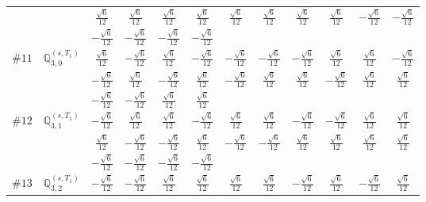 \documentclass[fleqn,9pt,landscape]{jsarticle}
\begin{document}
\begin{center}
\begin{longtable}{lcccccccccc}
& $ \frac{\sqrt{6}}{12} $ & $ \frac{\sqrt{6}}{12} $ & $ \frac{\sqrt{6}}{12} $ & $ \frac{\sqrt{6}}{12} $ & $ \frac{\sqrt{6}}{12} $ & $ \frac{\sqrt{6}}{12} $ & $ \frac{\sqrt{6}}{12} $ & $ \frac{\sqrt{6}}{12} $ & $ - \frac{\sqrt{6}}{12} $ & $ - \frac{\sqrt{6}}{12} $ \\
& $ - \frac{\sqrt{6}}{12} $ & $ - \frac{\sqrt{6}}{12} $ & $ - \frac{\sqrt{6}}{12} $ & $ - \frac{\sqrt{6}}{12} $ & $  $ & $  $ & $  $ & $  $ & $  $ & $  $ \\ \hline
$ \#11\quad \mathbb{Q}_{3,0}^{(s,T_{1})} $ & $ \frac{\sqrt{6}}{12} $ & $ - \frac{\sqrt{6}}{12} $ & $ \frac{\sqrt{6}}{12} $ & $ - \frac{\sqrt{6}}{12} $ & $ - \frac{\sqrt{6}}{12} $ & $ - \frac{\sqrt{6}}{12} $ & $ - \frac{\sqrt{6}}{12} $ & $ \frac{\sqrt{6}}{12} $ & $ \frac{\sqrt{6}}{12} $ & $ - \frac{\sqrt{6}}{12} $ \\
& $ - \frac{\sqrt{6}}{12} $ & $ \frac{\sqrt{6}}{12} $ & $ - \frac{\sqrt{6}}{12} $ & $ \frac{\sqrt{6}}{12} $ & $ - \frac{\sqrt{6}}{12} $ & $ \frac{\sqrt{6}}{12} $ & $ \frac{\sqrt{6}}{12} $ & $ - \frac{\sqrt{6}}{12} $ & $ \frac{\sqrt{6}}{12} $ & $ \frac{\sqrt{6}}{12} $ \\
& $ - \frac{\sqrt{6}}{12} $ & $ - \frac{\sqrt{6}}{12} $ & $ \frac{\sqrt{6}}{12} $ & $ \frac{\sqrt{6}}{12} $ & $  $ & $  $ & $  $ & $  $ & $  $ & $  $ \\ \hline
$ \#12\quad \mathbb{Q}_{3,1}^{(s,T_{1})} $ & $ - \frac{\sqrt{6}}{12} $ & $ \frac{\sqrt{6}}{12} $ & $ \frac{\sqrt{6}}{12} $ & $ - \frac{\sqrt{6}}{12} $ & $ \frac{\sqrt{6}}{12} $ & $ \frac{\sqrt{6}}{12} $ & $ - \frac{\sqrt{6}}{12} $ & $ - \frac{\sqrt{6}}{12} $ & $ \frac{\sqrt{6}}{12} $ & $ \frac{\sqrt{6}}{12} $ \\
& $ \frac{\sqrt{6}}{12} $ & $ - \frac{\sqrt{6}}{12} $ & $ - \frac{\sqrt{6}}{12} $ & $ \frac{\sqrt{6}}{12} $ & $ - \frac{\sqrt{6}}{12} $ & $ - \frac{\sqrt{6}}{12} $ & $ \frac{\sqrt{6}}{12} $ & $ \frac{\sqrt{6}}{12} $ & $ \frac{\sqrt{6}}{12} $ & $ \frac{\sqrt{6}}{12} $ \\
& $ - \frac{\sqrt{6}}{12} $ & $ - \frac{\sqrt{6}}{12} $ & $ - \frac{\sqrt{6}}{12} $ & $ - \frac{\sqrt{6}}{12} $ & $  $ & $  $ & $  $ & $  $ & $  $ & $  $ \\ \hline
$ \#13\quad \mathbb{Q}_{3,2}^{(s,T_{1})} $ & $ - \frac{\sqrt{6}}{12} $ & $ - \frac{\sqrt{6}}{12} $ & $ \frac{\sqrt{6}}{12} $ & $ \frac{\sqrt{6}}{12} $ & $ \frac{\sqrt{6}}{12} $ & $ \frac{\sqrt{6}}{12} $ & $ - \frac{\sqrt{6}}{12} $ & $ \frac{\sqrt{6}}{12} $ & $ - \frac{\sqrt{6}}{12} $ & $ \frac{\sqrt{6}}{12} $ \\

\end{longtable}
\end{center}
\end{document}
